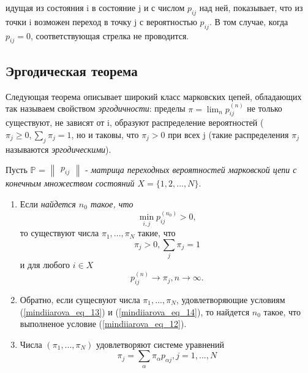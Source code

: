 идущая из состояния i в состояние j и с числом $p_{ij}$ над ней, показывает, что из точки i возможен переход в точку j с вероятностью $p_{ij}$. В том случае, когда $p_{ij} = 0$, соответствующая стрелка не проводится.

\subsection{Эргодическая теорема}

Следующая теорема описывает широкий класс марковских цепей, обладающих так называем свойством \textit{эргодичности}: пределы  $\pi =  \lim_{n}p_{ij}^{(n)} $ не только существуют, не зависят от i, образуют распределение вероятностей ($\pi_j \geq 0, \sum\limits_{j}\pi_j = 1$, но и таковы, что $\pi_j > 0$ при всех j (такие распределения $\pi_j$ называются  \textit{эргодическими}).



\begin{theorem}

Пусть $\mathbb{P}$ =  
$\begin{Vmatrix}
    p_{ij}
\end{Vmatrix}  $
- \textit{матрица переходных вероятностей марковской цепи с конечным множеством состояний $X = \{1, 2, ..., N\}$}.

\begin{enumerate}[label=\alph*)]
\item  Если \textit{найдется $n_0$ такое, что} 
\begin{equation} \label{mindiiarova_eq_12} 
    \min_{i,j}p_{ij}^{(n_0)}>0,
\end{equation}
то существуют числа $\pi_1, ..., \pi_N$ такие, что
\begin{equation} \label{mindiiarova_eq_13} 
    \pi_j > 0,  \sum\limits_{j}\pi_j = 1
\end{equation}
и для любого $i \in X$
\begin{equation} \label{mindiiarova_eq_14} 
    p_{ij}^{(n)} \rightarrow \pi_j ,  n \rightarrow \infty.
\end{equation}

\item Обратно, если сущесвуют числа $\pi_1, ..., \pi_N$, удовлетворяющие условиям (\ref{mindiiarova_eq_13}) и (\ref{mindiiarova_eq_14}), то найдется $n_0$ такое, что выполненое условие (\ref{mindiiarova_eq_12}).

\item Числа  $(\pi_1, ..., \pi_N)$ удовлетворяют системе уравнений
\begin{equation} \label{mindiiarova_eq_15} 
    \pi_j = \sum\limits_{\alpha}\pi_{\alpha}p_{\alpha j}, j = 1, ..., N
\end{equation}
\end{enumerate}

\end{theorem}


